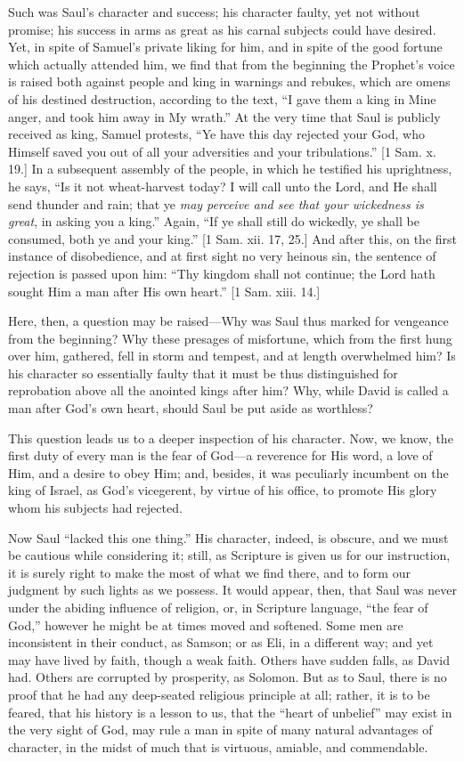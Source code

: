 Such was Saul's character and success; his character faulty, yet
not without promise; his success in arms as great as his carnal
subjects could have desired. Yet, in spite of Samuel's private
liking for him, and in spite of the good fortune which actually
attended him, we find that from the beginning the Prophet's voice is
raised both against people and king in warnings and rebukes, which are
omens of his destined destruction, according to the text, ``I gave
them a king in Mine anger, and took him away in My wrath.'' At the
very time that Saul is publicly received as king, Samuel protests,
``Ye have this day rejected your God, who Himself saved you out of
all your adversities and your tribulations.'' [1 Sam. x. 19.] In a
subsequent assembly of the people, in which he testified his
uprightness, he says, ``Is it not wheat-harvest today? I will call
unto the Lord, and He shall send thunder and rain; that ye \emph{may
perceive and see that your wickedness is great}, in asking you a
king.'' Again, ``If ye shall still do wickedly, ye shall be
consumed, both ye and your king.'' [1 Sam. xii. 17, 25.] And after
this, on the first instance of disobedience, and at first sight no
very heinous sin, the sentence of rejection is passed upon him:
``Thy kingdom shall not continue; the Lord hath sought Him a man
after His own heart.'' [1 Sam. xiii. 14.]

Here, then, a question may be raised—Why was Saul thus marked for
vengeance from the beginning? Why these presages of misfortune, which
from the first hung over him, gathered, fell in storm and tempest, and
at length overwhelmed him? Is his character so essentially faulty that
it must be thus distinguished for reprobation above all the anointed
kings after him? Why, while David is called a man after God's own
heart, should Saul be put aside as worthless?

This question leads us to a deeper inspection of his character.
Now, we know, the first duty of every man is the fear of God—a
reverence for His word, a love of Him, and a desire to obey Him; and,
besides, it was peculiarly incumbent on the king of Israel, as God's
vicegerent, by virtue of his office, to promote His glory whom his
subjects had rejected.

Now Saul ``lacked this one thing.'' His character, indeed,
is obscure, and we must be cautious while considering it; still, as
Scripture is given us for our instruction, it is surely right to make
the most of what we find there, and to form our judgment by such
lights as we possess. It would appear, then, that Saul was never under
the abiding influence of religion, or, in Scripture language,
``the fear of God,'' however he might be at times moved and
softened. Some men are inconsistent in their conduct, as Samson; or as
Eli, in a different way; and yet may have lived by faith, though a
weak faith. Others have sudden falls, as David had. Others are
corrupted by prosperity, as Solomon. But as to Saul, there is no proof
that he had any deep-seated religious principle at all; rather, it is
to be feared, that his history is a lesson to us, that the ``heart
of unbelief'' may exist in the very sight of God, may rule a man
in spite of many natural advantages of character, in the midst of much
that is virtuous, amiable, and commendable.

